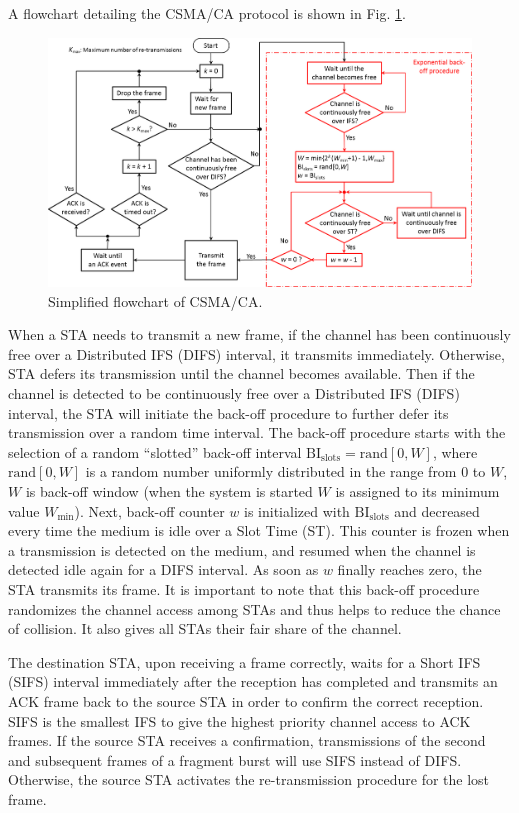 A flowchart detailing the CSMA/CA protocol is shown in Fig. \ref{figs:CSMA-CA-flowchart}. 
\begin{figure}[!th]
	\centering
	\includegraphics[width=1.0\columnwidth]{figs/CSMA-CA-flowchart}
	\caption{Simplified flowchart of CSMA/CA.}
	\label{figs:CSMA-CA-flowchart}
\end{figure}
When a STA needs to transmit a new frame, if the channel has been continuously free over a Distributed IFS (DIFS) interval, it transmits immediately. Otherwise, STA defers its transmission until the channel becomes available. Then if the channel is detected to be continuously free over a Distributed IFS (DIFS) interval, the STA will initiate the back-off procedure to further defer its transmission over a random time interval. The back-off procedure starts with the selection of a random ``slotted'' back-off interval $\mathrm{BI_{slots}} = \mathrm{rand}[0,W]$, where $\mathrm{rand}[0,W]$ is a random number uniformly distributed in the range from $0$ to $W$, $W$ is back-off window (when the system is started $W$ is assigned to its minimum value $W_{\min}$). Next, back-off counter $w$ is initialized with $\mathrm{BI_{slots}}$ and decreased every time the medium is idle over a Slot Time (ST). This counter is frozen when a transmission is detected on the medium, and resumed when the channel is detected idle again for a DIFS interval. As soon as $w$ finally reaches zero, the STA transmits its frame. It is important to note that this back-off procedure randomizes the channel access among STAs and thus helps to reduce the chance of collision. It also gives all STAs their fair share of the channel.

The destination STA, upon receiving a frame correctly, waits for a Short IFS (SIFS) interval immediately after the reception has completed and transmits an ACK frame back to the source STA in order to confirm the correct reception. SIFS is the smallest IFS to give the highest priority channel access to ACK frames. If the source STA receives a confirmation, transmissions of the second and subsequent frames of a fragment burst will use SIFS instead of DIFS. Otherwise, the source STA activates the re-transmission procedure for the lost frame.

